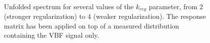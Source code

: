 \begin{figure}[htb]
\centering
{}
\\
\caption{Unfolded spectrum for several values of the $k_{reg}$ parameter, from 2 (stronger regularization) to 4 (weaker regularization). The response matrix has been applied on top of a measured distribution containing the VBF signal only.}
\label{fig:VBF_test}
\end{figure}



